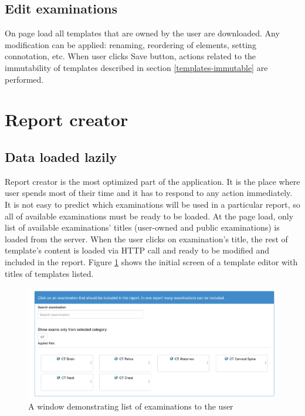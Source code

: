 \documentclass[12pt, twoside, openany]{report}
\theoremstyle{definition}
\begin{document}
\subsection{Edit examinations}
On page load all templates that are owned by the user are downloaded. Any modification can be applied: renaming, reordering of elements, setting connotation, etc. When user clicks Save button, actions related to the immutability of templates described in section \ref{templates-immutable} are performed.


\section{Report creator}

\subsection{Data loaded lazily}
Report creator is the most optimized part of the application. It is the place where user spends most of their time and it has to respond to any action immediately. It is not easy to predict which examinations will be used in a particular report, so all of available examinations must be ready to be loaded. At the page load, only list of available examinations' titles (user-owned and public examinations) is loaded from the server. When the user clicks on examination's title, the rest of template's content is loaded via HTTP call and ready to be modified and included in the report. Figure \ref{fig:examination-list} shows the initial screen of a template editor with titles of templates listed.
\begin{figure}
	\centering
	\includegraphics[width=0.9\linewidth]{examination-list}
	\caption{A window demonstrating list of examinations to the user\protect\footnotemark[3]
		\label{fig:examination-list}
	}
\end{figure}
\end{document}
